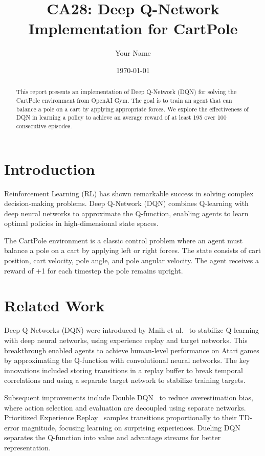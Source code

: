 \documentclass{IEEEtran}
\title{CA28: Deep Q-Network Implementation for CartPole}
\author{Your Name}
\date{\today}
\begin{document}
\maketitle

\begin{abstract}
This report presents an implementation of Deep Q-Network (DQN) for solving the CartPole environment from OpenAI Gym. The goal is to train an agent that can balance a pole on a cart by applying appropriate forces. We explore the effectiveness of DQN in learning a policy to achieve an average reward of at least 195 over 100 consecutive episodes.
\end{abstract}

\section{Introduction}

Reinforcement Learning (RL) has shown remarkable success in solving complex decision-making problems. Deep Q-Network (DQN) combines Q-learning with deep neural networks to approximate the Q-function, enabling agents to learn optimal policies in high-dimensional state spaces.

The CartPole environment is a classic control problem where an agent must balance a pole on a cart by applying left or right forces. The state consists of cart position, cart velocity, pole angle, and pole angular velocity. The agent receives a reward of +1 for each timestep the pole remains upright.

\section{Related Work}

Deep Q-Networks (DQN) were introduced by Mnih et al.~\cite{mnih2015human} to stabilize Q-learning with deep neural networks, using experience replay and target networks. This breakthrough enabled agents to achieve human-level performance on Atari games by approximating the Q-function with convolutional neural networks. The key innovations included storing transitions in a replay buffer to break temporal correlations and using a separate target network to stabilize training targets.

Subsequent improvements include Double DQN~\cite{van2016deep} to reduce overestimation bias, where action selection and evaluation are decoupled using separate networks. Prioritized Experience Replay~\cite{schaul2015prioritized} samples transitions proportionally to their TD-error magnitude, focusing learning on surprising experiences. Dueling DQN~\cite{wang2015dueling} separates the Q-function into value and advantage streams for better representation.
\end{document}
